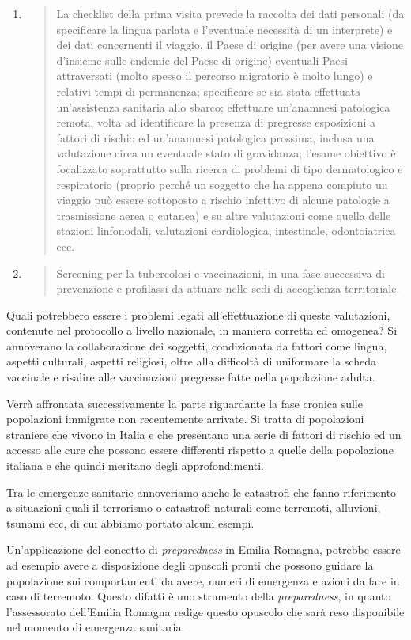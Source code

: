 \documentclass[]{article}
\begin{document}
\begin{enumerate}
\def\labelenumi{\arabic{enumi}.}
\item
  \begin{quote}
  La checklist della prima visita prevede la raccolta dei dati personali
  (da specificare la lingua parlata e l'eventuale necessità di un
  interprete) e dei dati concernenti il viaggio, il Paese di origine
  (per avere una visione d'insieme sulle endemie del Paese di origine)
  eventuali Paesi attraversati (molto spesso il percorso migratorio è
  molto lungo) e relativi tempi di permanenza; specificare se sia stata
  effettuata un'assistenza sanitaria allo sbarco; effettuare un'anamnesi
  patologica remota, volta ad identificare la presenza di pregresse
  esposizioni a fattori di rischio ed un'anamnesi patologica prossima,
  inclusa una valutazione circa un eventuale stato di gravidanza;
  l'esame obiettivo è focalizzato soprattutto sulla ricerca di problemi
  di tipo dermatologico e respiratorio (proprio perché un soggetto che
  ha appena compiuto un viaggio può essere sottoposto a rischio
  infettivo di alcune patologie a trasmissione aerea o cutanea) e su
  altre valutazioni come quella delle stazioni linfonodali, valutazioni
  cardiologica, intestinale, odontoiatrica ecc.
  \end{quote}
\item
  \begin{quote}
  Screening per la tubercolosi e vaccinazioni, in una fase successiva di
  prevenzione e profilassi da attuare nelle sedi di accoglienza
  territoriale.
  \end{quote}
\end{enumerate}

Quali potrebbero essere i problemi legati all'effettuazione di queste
valutazioni, contenute nel protocollo a livello nazionale, in maniera
corretta ed omogenea? Si annoverano la collaborazione dei soggetti,
condizionata da fattori come lingua, aspetti culturali, aspetti
religiosi, oltre alla difficoltà di uniformare la scheda vaccinale e
risalire alle vaccinazioni pregresse fatte nella popolazione adulta.

Verrà affrontata successivamente la parte riguardante la fase cronica
sulle popolazioni immigrate non recentemente arrivate. Si tratta di
popolazioni straniere che vivono in Italia e che presentano una serie di
fattori di rischio ed un accesso alle cure che possono essere differenti
rispetto a quelle della popolazione italiana e che quindi meritano degli
approfondimenti.

Tra le emergenze sanitarie annoveriamo anche le catastrofi che fanno
riferimento a situazioni quali il terrorismo o catastrofi naturali come
terremoti, alluvioni, tsunami ecc, di cui abbiamo portato alcuni esempi.

Un'applicazione del concetto di \emph{preparedness} in Emilia Romagna,
potrebbe essere ad esempio avere a disposizione degli opuscoli pronti
che possono guidare la popolazione sui comportamenti da avere, numeri di
emergenza e azioni da fare in caso di terremoto. Questo difatti è uno
strumento della \emph{preparedness}, in quanto l'assessorato dell'Emilia
Romagna redige questo opuscolo che sarà reso disponibile nel momento di
emergenza sanitaria.
\end{document}
